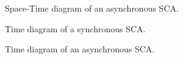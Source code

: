 \documentclass[pre,amssymb,showpacs,showkeys,preprint]{revtex4}
\begin{document}
\begin{figure}
\begin{center}
\caption{\label{fig:asynchronous-space-time} Space-Time diagram of an asynchronous SCA.}
\end{center}
\end{figure}

\begin{figure}
\begin{center}
\caption{\label{fig:synchronous-time} Time diagram of a synchronous SCA.}
\end{center}
\end{figure}

\begin{figure}
\begin{center}
\caption{\label{fig:asynchronous-time} Time diagram of an asynchronous SCA.}
\end{center}
\end{figure}
\end{document}
